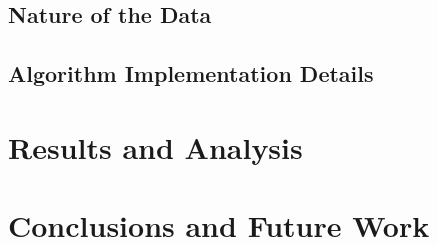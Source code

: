 \documentclass[titlepage]{article}
\begin{document}
\subsection{Nature of the Data}

\subsection{Algorithm Implementation Details}



\section{Results and Analysis}%



\section{Conclusions and Future Work}%


\newpage
\nocite{*}
\printbibliography
\end{document}
